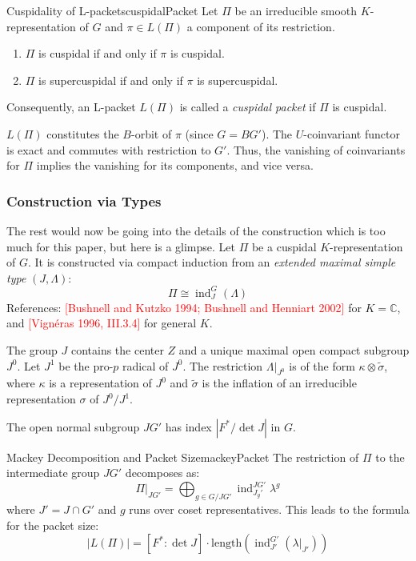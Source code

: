 \documentclass{article}
\begin{document}
\begin{prop}{Cuspidality of L-packets}{cuspidalPacket}
  Let \(\Pi\) be an irreducible smooth \(K\)-representation of \(G\) and \(\pi \in L(\Pi)\) a component of its restriction.
  \begin{enumerate}
      \item \(\Pi\) is cuspidal if and only if \(\pi\) is cuspidal.
      \item \(\Pi\) is supercuspidal if and only if \(\pi\) is supercuspidal.
  \end{enumerate}
  Consequently, an L-packet \(L(\Pi)\) is called a \emph{cuspidal packet} if \(\Pi\) is cuspidal.
\end{prop}

\begin{Proof}
  \(L(\Pi)\) constitutes the \(B\)-orbit of \(\pi\) (since \(G=BG'\)). The \(U\)-coinvariant functor is exact and commutes with restriction to \(G'\). Thus, the vanishing of coinvariants for \(\Pi\) implies the vanishing for its components, and vice versa.
\end{Proof}

\subsubsection*{Construction via Types}

The rest would now be going into the details of the construction which is too much for this paper, but here is
a glimpse. Let \(\Pi\) be a cuspidal \(K\)-representation of \(G\). It is constructed via compact induction from an \emph{extended maximal simple type} \((J, \Lambda)\):
\[
  \Pi \cong \operatorname{ind}_J^G(\Lambda)
\]
References: \textcolor{red}{[Bushnell and Kutzko 1994; Bushnell and Henniart 2002]} for \(K=\mathbb{C}\), and \textcolor{red}{[Vignéras 1996, III.3.4]} for general \(K\).

The group \(J\) contains the center \(Z\) and a unique maximal open compact subgroup \(J^0\). Let \(J^1\) be
the pro-\(p\) radical of \(J^0\). The restriction \(\Lambda|_{J^0}\) is of the form \(\kappa \otimes
\tilde{\sigma}\), where \(\kappa\) is a representation of \(J^0\) and \(\tilde{\sigma}\) is the inflation of
an irreducible representation \(\sigma\) of \(J^0/J^1\).

The open normal subgroup \(JG'\) has index \(|F^*/\det J|\) in \(G\).

\begin{prop}{Mackey Decomposition and Packet Size}{mackeyPacket}
  The restriction of \(\Pi\) to the intermediate group \(JG'\) decomposes as:
  \[ \Pi|_{JG'} = \bigoplus_{g \in G/JG'} \operatorname{ind}_{J_g'}^{JG'} \lambda^g \]
  where \(J' = J \cap G'\) and \(g\) runs over coset representatives. This leads to the formula for the packet size:
  \[ |L(\Pi)| = [F^* : \det J] \cdot \mathrm{length}(\operatorname{ind}_{J'}^{G'} (\lambda|_{J'})) \]
\end{prop}
\end{document}

